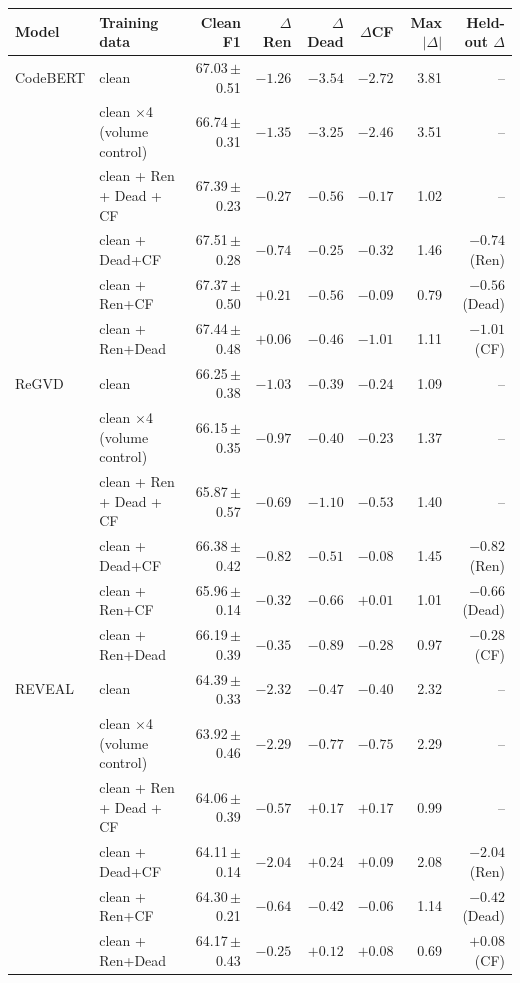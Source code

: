 \begin{tabular}{llrrrrrr}
\toprule
Model & Training data & Clean F1 & $\Delta$Ren & $\Delta$Dead & $\Delta$CF & Max$|\Delta|$ & Held-out $\Delta$ \\
\midrule
CodeBERT & clean & 67.03\,$\pm$\,0.51 & $\mathbf{-1.26}$ & $\mathbf{-3.54}$ & $\mathbf{-2.72}$ & 3.81 & -- \\
 & clean $\times$4 (volume control) & 66.74\,$\pm$\,0.31 & $\mathbf{-1.35}$ & $\mathbf{-3.25}$ & $\mathbf{-2.46}$ & 3.51 & -- \\
 & clean + Ren + Dead + CF & 67.39\,$\pm$\,0.23 & $-0.27$ & $\mathbf{-0.56}$ & $-0.17$ & 1.02 & -- \\
 & clean + Dead+CF & 67.51\,$\pm$\,0.28 & $-0.74$ & $-0.25$ & $\mathbf{-0.32}$ & 1.46 & $-0.74$ (Ren) \\
 & clean + Ren+CF & 67.37\,$\pm$\,0.50 & $+0.21$ & $\mathbf{-0.56}$ & $-0.09$ & 0.79 & $\mathbf{-0.56}$ (Dead) \\
 & clean + Ren+Dead & 67.44\,$\pm$\,0.48 & $+0.06$ & $-0.46$ & $\mathbf{-1.01}$ & 1.11 & $\mathbf{-1.01}$ (CF) \\
\midrule
ReGVD & clean & 66.25\,$\pm$\,0.38 & $\mathbf{-1.03}$ & $-0.39$ & $-0.24$ & 1.09 & -- \\
 & clean $\times$4 (volume control) & 66.15\,$\pm$\,0.35 & $\mathbf{-0.97}$ & $-0.40$ & $-0.23$ & 1.37 & -- \\
 & clean + Ren + Dead + CF & 65.87\,$\pm$\,0.57 & $-0.69$ & $\mathbf{-1.10}$ & $\mathbf{-0.53}$ & 1.40 & -- \\
 & clean + Dead+CF & 66.38\,$\pm$\,0.42 & $\mathbf{-0.82}$ & $-0.51$ & $-0.08$ & 1.45 & $\mathbf{-0.82}$ (Ren) \\
 & clean + Ren+CF & 65.96\,$\pm$\,0.14 & $-0.32$ & $\mathbf{-0.66}$ & $+0.01$ & 1.01 & $\mathbf{-0.66}$ (Dead) \\
 & clean + Ren+Dead & 66.19\,$\pm$\,0.39 & $\mathbf{-0.35}$ & $\mathbf{-0.89}$ & $-0.28$ & 0.97 & $-0.28$ (CF) \\
\midrule
REVEAL & clean & 64.39\,$\pm$\,0.33 & $\mathbf{-2.32}$ & $-0.47$ & $-0.40$ & 2.32 & -- \\
 & clean $\times$4 (volume control) & 63.92\,$\pm$\,0.46 & $\mathbf{-2.29}$ & $\mathbf{-0.77}$ & $\mathbf{-0.75}$ & 2.29 & -- \\
 & clean + Ren + Dead + CF & 64.06\,$\pm$\,0.39 & $-0.57$ & $+0.17$ & $+0.17$ & 0.99 & -- \\
 & clean + Dead+CF & 64.11\,$\pm$\,0.14 & $-2.04$ & $+0.24$ & $+0.09$ & 2.08 & $-2.04$ (Ren) \\
 & clean + Ren+CF & 64.30\,$\pm$\,0.21 & $\mathbf{-0.64}$ & $\mathbf{-0.42}$ & $-0.06$ & 1.14 & $\mathbf{-0.42}$ (Dead) \\
 & clean + Ren+Dead & 64.17\,$\pm$\,0.43 & $-0.25$ & $+0.12$ & $+0.08$ & 0.69 & $+0.08$ (CF) \\
\bottomrule
\end{tabular}
